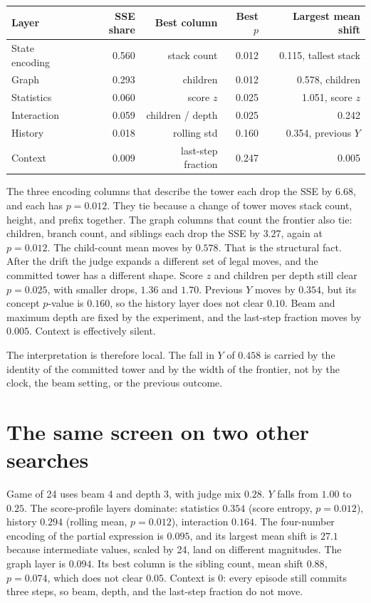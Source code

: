 \documentclass[11pt,a4paper]{article}
\begin{document}
\begin{center}
\begin{tabular}{lrrrr}
\toprule
Layer & SSE share & Best column & Best \(p\) & Largest mean shift \\
\midrule
State encoding & 0.560 & stack count & 0.012 & 0.115, tallest stack \\
Graph & 0.293 & children & 0.012 & 0.578, children \\
Statistics & 0.060 & score \(z\) & 0.025 & 1.051, score \(z\) \\
Interaction & 0.059 & children / depth & 0.025 & 0.242 \\
History & 0.018 & rolling std & 0.160 & 0.354, previous \(Y\) \\
Context & 0.009 & last-step fraction & 0.247 & 0.005 \\
\bottomrule
\end{tabular}
\end{center}

The three encoding columns that describe the tower each drop the SSE by \(6.68\), and each has \(p=0.012\).
They tie because a change of tower moves stack count, height, and prefix together.
The graph columns that count the frontier also tie: children, branch count, and siblings each drop the SSE by \(3.27\), again at \(p=0.012\).
The child-count mean moves by \(0.578\).
That is the structural fact.
After the drift the judge expands a different set of legal moves, and the committed tower has a different shape.
Score \(z\) and children per depth still clear \(p=0.025\), with smaller drops, \(1.36\) and \(1.70\).
Previous \(Y\) moves by \(0.354\), but its concept \(p\)-value is \(0.160\), so the history layer does not clear \(0.10\).
Beam and maximum depth are fixed by the experiment, and the last-step fraction moves by \(0.005\).
Context is effectively silent.

The interpretation is therefore local.
The fall in \(Y\) of \(0.458\) is carried by the identity of the committed tower and by the width of the frontier, not by the clock, the beam setting, or the previous outcome.

\section{The same screen on two other searches}
Game of 24 uses beam 4 and depth 3, with judge mix \(0.28\).
\(Y\) falls from \(1.00\) to \(0.25\).
The score-profile layers dominate: statistics \(0.354\) (score entropy, \(p=0.012\)), history \(0.294\) (rolling mean, \(p=0.012\)), interaction \(0.164\).
The four-number encoding of the partial expression is \(0.095\), and its largest mean shift is \(27.1\) because intermediate values, scaled by 24, land on different magnitudes.
The graph layer is \(0.094\).
Its best column is the sibling count, mean shift \(0.88\), \(p=0.074\), which does not clear \(0.05\).
Context is \(0\): every episode still commits three steps, so beam, depth, and the last-step fraction do not move.
\end{document}
